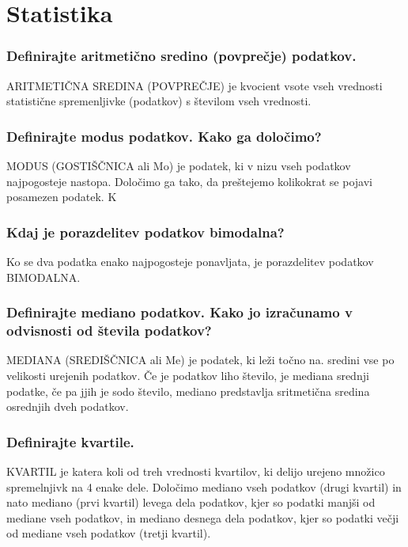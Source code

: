 \documentclass{article}
\begin{document}
\section{Statistika}
\subsubsection*{Definirajte aritmetično sredino (povprečje) podatkov.}

ARITMETIČNA SREDINA (POVPREČJE) je kvocient vsote vseh vrednosti statistične spremenljivke (podatkov) s številom vseh vrednosti.

\subsubsection*{Definirajte modus podatkov. Kako ga določimo?}

MODUS (GOSTIŠČNICA ali Mo) je podatek, ki v nizu vseh podatkov najpogosteje nastopa. Določimo ga tako, da preštejemo kolikokrat se pojavi posamezen podatek. K

\subsubsection*{Kdaj je porazdelitev podatkov bimodalna?}

Ko se dva podatka enako najpogosteje ponavljata, je porazdelitev podatkov BIMODALNA.

\subsubsection*{Definirajte mediano podatkov. Kako jo izračunamo v odvisnosti od števila podatkov?}

MEDIANA (SREDIŠČNICA ali Me) je podatek, ki leži točno na. sredini vse po velikosti urejenih podatkov. Če je podatkov liho število, je mediana srednji podatke, če pa jjih je sodo število, mediano predstavlja sritmetična sredina osrednjih dveh podatkov.

\subsubsection*{Definirajte kvartile.}

KVARTIL je katera koli od treh vrednosti kvartilov, ki delijo urejeno množico spremelnjivk na 4 enake dele. Določimo mediano vseh podatkov (drugi kvartil) in nato mediano (prvi kvartil) levega dela podatkov, kjer so podatki manjši od mediane vseh podatkov, in mediano desnega dela podatkov, kjer so podatki večji od mediane vseh podatkov (tretji kvartil).
\end{document}

